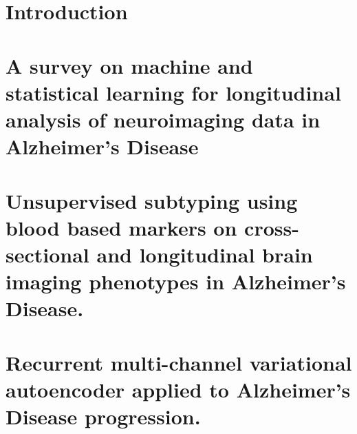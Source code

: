 \documentclass[12pt, b5paper,twoside]{tesi_upf}
\begin{document}
\cleardoublepage



\tableofcontents

\listoffigures

\listoftables

\mainmatter

\chapter{Introduction} \label{ch:1-introduction}


\chapter[A survey on machine and statistical learning for longitudinal analysis of neuroimaging data in Alzheimer’s Disease]{A survey on machine and statistical learning for longitudinal analysis of neuroimaging data in Alzheimer’s Disease} \label{ch:2-review}


\chapter{Unsupervised subtyping using blood based markers on cross-sectional and longitudinal brain imaging phenotypes in Alzheimer's Disease.} \label{ch:3-cimlr}


\chapter{Recurrent multi-channel variational autoencoder applied to Alzheimer's Disease progression.} \label{ch:4-rnnvae}

\end{document}
